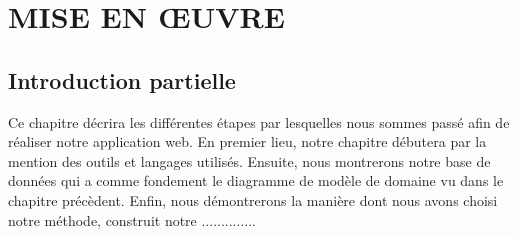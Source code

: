 \chapter[MISE EN ŒUVRE]{MISE EN ŒUVRE}
    \section[Introduction partielle]{Introduction partielle}
    Ce chapitre décrira les différentes étapes par lesquelles nous
    sommes passé afin de réaliser notre application web. En premier
    lieu, notre chapitre débutera par la mention des outils et
    langages utilisés. Ensuite, nous montrerons notre base de données qui a
    comme fondement le diagramme de modèle de domaine vu dans
    le chapitre précèdent. Enfin, nous démontrerons la manière dont
    nous avons choisi notre méthode, construit notre ..............